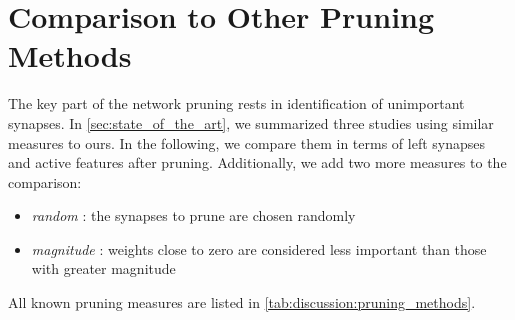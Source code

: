 \section{Comparison to Other Pruning Methods} \label{sec:comparison_of_pruning_methods}
The key part of the network pruning rests in identification of unimportant synapses. In \cref{sec:state_of_the_art}, we summarized three studies using similar measures to ours. In the following, we compare them in terms of left synapses and active features after pruning. Additionally, we add two more measures to the comparison:

\begin{itemize}
\item \textit{random} : the synapses to prune are chosen randomly
\item \textit{magnitude} : weights close to zero are considered less important than those with greater magnitude
\end{itemize}

All known pruning measures are listed in \cref{tab:discussion:pruning_methods}.

\begin{table}[H]
\centering
{}
\caption{Known measures of how important synapse corresponding to $ w_k $ is.}
\label{tab:discussion:pruning_methods}
\end{table}

